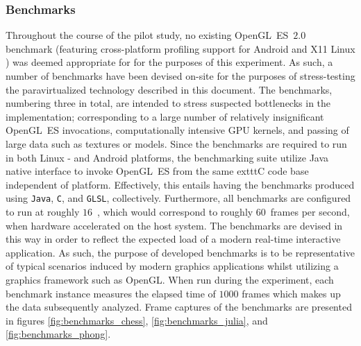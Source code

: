 \subsubsection{Benchmarks}
\label{sec:experimentalmethodology_benchmarks}
Throughout the course of the pilot study, no existing OpenGL~ES~$2.0$ benchmark (featuring cross-platform profiling support for Android and X11 Linux ) was deemed appropriate for for the purposes of this experiment.
As such, a number of benchmarks have been devised on-site for the purposes of stress-testing the paravirtualized technology described in this document.
The benchmarks, numbering three in total, are intended to stress suspected bottlenecks in the implementation; corresponding to a large number of relatively insignificant OpenGL~ES invocations, computationally intensive GPU kernels, and passing of large data such as textures or models.
Since the benchmarks are required to run in both Linux - and Android platforms, the benchmarking suite utilize Java native interface to invoke OpenGL~ES from the same 	exttt{C} code base independent of platform.
Effectively, this entails having the benchmarks produced using \texttt{Java}, \texttt{C}, and \texttt{GLSL}, collectively.
Furthermore, all benchmarks are configured to run at roughly $16$~\milli\second , which would correspond to roughly $60$~frames per second, when hardware accelerated on the host system.
The benchmarks are devised in this way in order to reflect the expected load of a modern real-time interactive application.
As such, the purpose of developed benchmarks is to be representative of typical scenarios induced by modern graphics applications whilst utilizing a graphics framework such as OpenGL.
When run during the experiment, each benchmark instance measures the elapsed time of $1000$ frames which makes up the data subsequently analyzed.
Frame captures of the benchmarks are presented in figures \ref{fig:benchmarks_chess}, \ref{fig:benchmarks_julia}, and \ref{fig:benchmarks_phong}.

